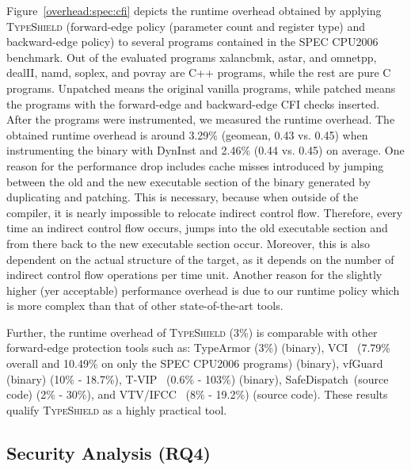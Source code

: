 Figure~\ref{overhead:spec:cfi} depicts the runtime overhead obtained by applying \textsc{TypeShield} (forward-edge policy (parameter count and register type) and backward-edge policy)
to several programs contained in the SPEC CPU2006 benchmark. 
Out of the evaluated programs xalancbmk, astar, and omnetpp, dealII, namd, soplex, and povray are C++ programs, while the rest are pure C programs. 
Unpatched means the original vanilla programs, while patched means the programs with the forward-edge and backward-edge CFI checks inserted.
After the programs were instrumented, we measured the runtime overhead.
The obtained runtime overhead is around 3.29\% (geomean,  0.43 vs. 0.45) when instrumenting the binary with DynInst and 2.46\% (0.44 vs. 0.45) on average.
One reason for the performance drop includes cache misses introduced by jumping between the old and the new executable section 
of the binary generated by duplicating and patching. This is necessary, because when
outside of the compiler, it is nearly impossible to relocate indirect control flow. Therefore, 
every time an indirect control flow occurs, jumps into the old executable section and from 
there back to the new executable section occur. Moreover, this is also dependent on the actual structure 
of the target, as it depends on the number of indirect control flow operations per time unit.
Another reason for the slightly higher (yer acceptable) performance overhead is due to our
runtime policy which is more complex than that of other state-of-the-art tools.

Further, the runtime overhead of \textsc{TypeShield} (3\%) is comparable with other forward-edge protection
tools such as: TypeArmor (3\%) (binary), VCI~\cite{vci:asiaccs} (7.79\% overall and 10.49\% on only the SPEC CPU2006 programs) (binary), 
vfGuard~\cite{vfuard:aravind} (binary) (10\% - 18.7\%), T-VIP~\cite{gawlik} (0.6\% - 103\%) (binary), 
SafeDispatch~\cite{safedispatch:jang}(source code) (2\% - 30\%), and VTV/IFCC~\cite{vtv:tice} (8\% - 19.2\%) (source code).
These results qualify \textsc{TypeShield} as a highly practical tool.


\subsection{Security Analysis (RQ4)}
\label{RQ5: Security Analysis}
\textit{}

